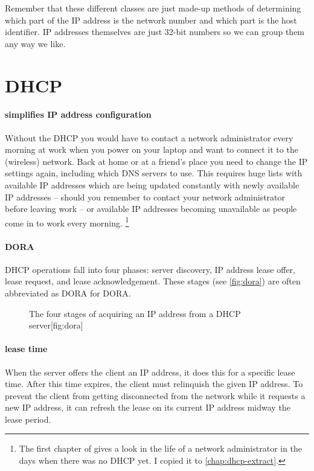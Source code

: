 Remember that these different classes are just made-up methods of determining which part of the \acs{IP} address is the network number and which part is the host identifier.
\acs{IP} addresses themselves are just 32-bit numbers so we can group them any way we like.


\section{\acl{DHCP}}
\label{sec:ip-dhcp}


\paragraph{simplifies \acs{IP} address configuration}
Without the \gls{DHCP} you would have to contact a network administrator every morning at work when you power on your laptop and want to connect it to the (wireless) network.
Back at home or at a friend's place you need to change the \acs{IP} settings again, including which \acs{DNS} servers to use.
This requires huge lists with available \acs{IP} addresses which are being updated constantly with newly available \acs{IP} addresses -- should you remember to contact your network administrator before leaving work -- or available \acs{IP} addresses becoming unavailable as people come in to work every morning.%
   \footnote{%
      The first chapter of \textcite[3-7]{droms} gives a look in the life of a network administrator in the days when there was no \acs{DHCP} yet.
      I copied it to \vref{chap:dhcp-extract}.
   }

\paragraph{\acs{DORA}}
\gls{DHCP} operations fall into four phases: server discovery, \acs{IP} address lease offer, lease request, and lease acknowledgement.
These stages (see \vref{fig:dora}) are often abbreviated as \acs{DORA} for \acl{DORA}.

\begin{figure}
\begin{sidecaption}{The four stages of acquiring an \acs{IP} address from a \acs{DHCP} server}[fig:dora]
\centering

\end{sidecaption}
\end{figure}

\paragraph{lease time}
When the server offers the client an \acs{IP} address, it does this for a specific lease time.
After this time expires, the client must relinquish the given \acs{IP} address.
To prevent the client from getting disconnected from the network while it requests a new \acs{IP} address, it can refresh the lease on its current \acs{IP} address midway the lease period.

